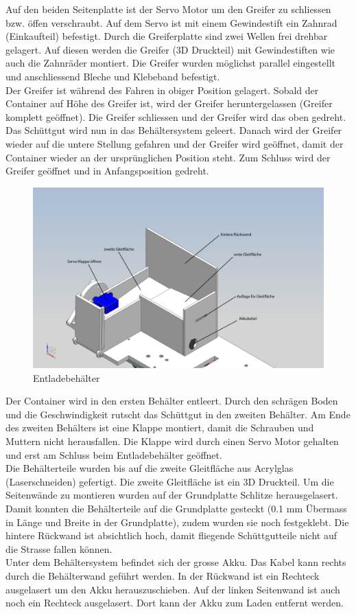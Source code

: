 Auf den beiden Seitenplatte ist der Servo Motor um den Greifer zu schliessen bzw. öffen verschraubt. Auf dem Servo ist mit einem Gewindestift ein Zahnrad (Einkaufteil) befestigt. Durch die Greiferplatte sind zwei Wellen frei drehbar gelagert. Auf diesen werden die Greifer (3D Druckteil) mit Gewindestiften wie auch die Zahnräder montiert. Die Greifer wurden möglichst parallel eingestellt und anschliessend Bleche und Klebeband befestigt.
\\
Der Greifer ist während des Fahren in obiger Position gelagert. Sobald der Container auf Höhe des Greifer ist, wird der Greifer heruntergelassen (Greifer komplett geöffnet). Die Greifer schliessen und der Greifer wird das oben gedreht. Das Schüttgut wird nun in das Behältersystem geleert. Danach wird der Greifer wieder auf die untere Stellung gefahren und der Greifer wird geöffnet, damit der Container wieder an der ursprünglichen Position steht. Zum Schluss wird der Greifer geöffnet und in Anfangsposition gedreht.\\[0.2cm]
\begin{figure}[H]
\centering
\includegraphics[width=1\textwidth]{03_Loesungskonzept/pictures/entladen11.png}
\caption{Entladebehälter}
\end{figure}
Der Container wird in den ersten Behälter entleert. Durch den schrägen Boden und die Geschwindigkeit rutscht das Schüttgut in den zweiten Behälter. Am Ende des zweiten Behälters ist eine Klappe montiert, damit die Schrauben und Muttern nicht herausfallen. Die Klappe wird durch einen Servo Motor gehalten und erst am Schluss beim Entladebehälter geöffnet.\\[0.2cm]
Die Behälterteile wurden bis auf die zweite Gleitfläche aus Acrylglas (Laserschneiden) gefertigt. Die zweite Gleitfläche ist ein 3D Druckteil.
Um die Seitenwände zu montieren wurden auf der Grundplatte Schlitze herausgelasert. Damit konnten die Behälterteile auf die Grundplatte gesteckt (0.1 mm Übermass in Länge und Breite in der Grundplatte), zudem wurden sie noch festgeklebt. Die hintere Rückwand ist absichtlich hoch, damit fliegende Schüttgutteile nicht auf die Strasse fallen können.\\[0.2cm] 
Unter dem Behältersystem befindet sich der grosse Akku. Das Kabel kann rechts durch die Behälterwand geführt werden. In der Rückwand ist ein Rechteck ausgelasert um den Akku herauszuschieben. Auf der linken Seitenwand ist auch noch ein Rechteck ausgelasert. Dort kann der Akku zum Laden entfernt werden.